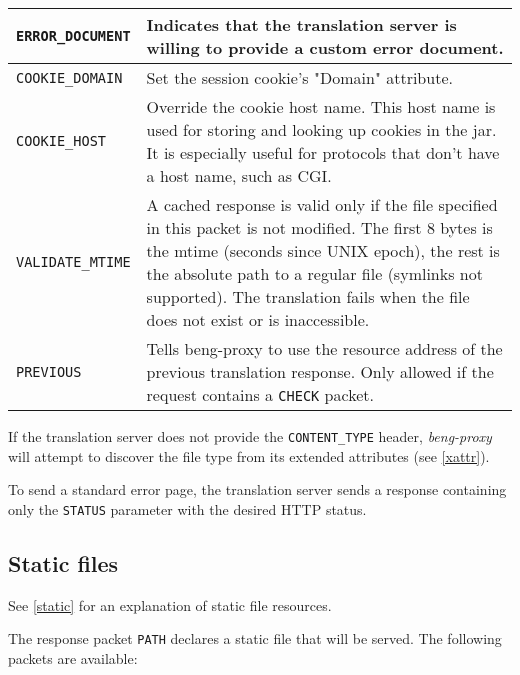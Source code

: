 \documentclass[a4paper,12pt]{article}
\begin{document}
\begin{longtable}{|l|p{8cm}|}
\hline

\verb|ERROR_DOCUMENT| & Indicates that the translation server is
willing to provide a custom error document. \\

\hline

\verb|COOKIE_DOMAIN| & Set the session cookie's "Domain" attribute. \\

\hline

\verb|COOKIE_HOST| & Override the cookie host name.  This host name
is used for storing and looking up cookies in the jar.  It is
especially useful for protocols that don't have a host name, such as
CGI. \\

\hline

\verb|VALIDATE_MTIME| & A cached response is valid only if the file
specified in this packet is not modified.
The first 8 bytes is the mtime (seconds since UNIX epoch), the rest is
the absolute path to a regular file (symlinks not supported).  The
translation fails when the file does not exist or is inaccessible.  \\

\hline

\verb|PREVIOUS| & Tells beng-proxy to use the resource address of
the previous translation response.  Only allowed if the request
contains a \verb|CHECK| packet. \\

\hline
\end{longtable}

If the translation server does not provide the \verb|CONTENT_TYPE|
header, \emph{beng-proxy} will attempt to discover the file type from
its extended attributes (see \ref{xattr}).

To send a standard error page, the translation server sends a response
containing only the \verb|STATUS| parameter with the desired HTTP
status.

\subsection{Static files}
\label{tstatic}

See \ref{static} for an explanation of static file resources.

The response packet \verb|PATH| declares a static file that will be
served.  The following packets are available:
\end{document}
